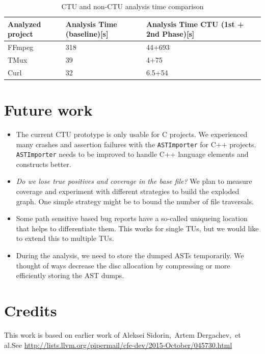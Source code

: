\documentclass{article}
\begin{document}
\begin {table}[h!]
\centering
\begin{tabular}{| L{2cm}| C{2cm} | C{2cm} | C{2cm}|}
  \hline
  Analyzed project& Analysis Time (baseline)[s]&Analysis Time CTU (1st + 2nd Phase)[s]\\
  \hline
  \hline
  FFmpeg& 318&44+693\\
  \hline
  TMux& 39&4+75\\
  \hline
  Curl& 32&6.5+54\\
  \hline  
\end{tabular}
\caption{CTU and non-CTU analysis time comparison}
\label{tbltime}
\end{table}

\section{Future work}

\begin{itemize}
\item The current CTU prototype is only usable for C projects.
  We experienced many crashes and assertion failures with the
  \texttt{ASTImporter} for C++ projects.
  \texttt{ASTImporter} needs to be improved to handle C++ language elements
  and constructs better.
\item \emph{Do we lose true positives and coverage in the base file?}
We plan to measure coverage and experiment with different strategies
to build the exploded graph. One simple strategy might be to bound
the number of file traversals.

\item Some path sensitive based bug reports have a so-called uniqueing location that helps
to differentiate them. This works for single TUs, but we would like
to extend this to multiple TUs.
\item During the analysis, we need to store the dumped ASTs temporarily. 
We thought of ways decrease the disc allocation by compressing or 
more efficiently storing the AST dumps.
\end{itemize}

\section{Credits} %
This work is based on earlier work of Aleksei Sidorin,\ Artem Dergachev,\ 
et al.\@ See \url{http://lists.llvm.org/pipermail/cfe-dev/2015-October/045730.html}
\end{document}
